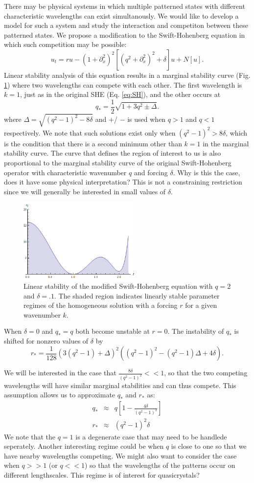 \documentclass[api,pof,pre,12pt,a4paper]{revtex4-1}
\newcommand{\beqn}{\begin{equation}}
\newcommand{\eeqn}{\end{equation}}
\newcommand{\beqa}{\begin{eqnarray}}
\newcommand{\eeqa}{\end{eqnarray}}
\newcommand{\FIGmarginalstability}{
\begin{figure}[t]\center
\includegraphics[width=60mm]{MarginalStability.png}
\caption{\label{fig:marginalstability} Linear stability of the modified Swift-Hohenberg equation with $q=2$ and $\delta=.1$.  The shaded region indicates linearly stable parameter regimes of the homogeneous solution with a forcing $r$ for a given wavenumber $k$.}
\end{figure}
}
\begin{document}
There may be physical systems in which multiple patterned states with different characteristic wavelengths can exist simultanously.  We would like to develop a model for such a system and study the interaction and competiton between these patterned states.  We propose a modification to the Swift-Hohenberg equation in which such competition may be possible:
\begin{equation}
u_t= r u-\left(1+\partial_{x}^2\right)^2 \left[\left(q^2+\partial_{x}^2\right)^2+\delta \right] u+N[u]\label{eq:SHm}.
\end{equation}
Linear stability analysis of this equation results in a marginal stability curve (Fig. \ref{fig:marginalstability}) where two wavelengths can compete with each other.  The first wavelength is  $k=1$, just as in the original SHE (Eq. \ref{eq:SH}), and the other occurs at 
\beqn
q_*=\frac{1}{2}\sqrt{1+3q^2 \pm\Delta}.
\eeqn
where $\Delta=\sqrt{(q^2-1)^2-8\delta}$ and $+$/ $-$ is used when $q>1$ and $q<1$ respectively.  We note that such solutions exist only when $(q^2-1)^2>8\delta$, which is the condition that there is a second minimum other than $k=1$ in the marginal stability curve.  The curve that defines the region of interest to us is also proportional to the marginal stability curve of the original Swift-Hohenberg operator with characteristic wavenumber $q$ and forcing $\delta$.  Why is this the case, does it have some physical interpretation?  This is not a constraining restriction since we will generally be interested in small values of $\delta$.
\FIGmarginalstability
When $\delta=0$ and $q_*=q$  both  become unstable at $r=0$. The instability of $q_*$ is shifted for nonzero values of $\delta$ by
\beqn
r_*=\frac{1}{128} \left(3( q^2-1)+\Delta\right)^2 \left( (q^2-1)^2- (q^2-1)\Delta+4 \delta \right).
\eeqn

We will be interested in the case that $\tfrac{8\delta}{(q^2-1)^2}<<1$,  so that the two competing wavelengths will have similar marginal stabilities and can thus compete.  This assumption allows us to approximate $q_*$ and $r_*$ as:
\beqa
q_*&\approx&q\left[1-\frac{4\delta}{(q^2-1)^2}\right] \\
r_*&\approx& (q^2-1)^2 \delta
\eeqa
We note that the $q=1$ is a degenerate case that may need to be handlede seperately.  Another interesting regime could be when $q$ is close to one so that we have nearby wavelengths competing. We might also want to consider the case when $q>>1$ (or $q<<1$) so that the wavelengths of the patterns occur on different lengthscales.  This regime is of interest for quasicrystals?
\end{document}
